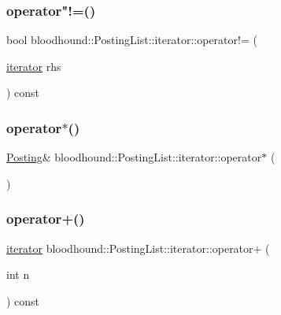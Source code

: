 \subsubsection{\texorpdfstring{operator"!=()}{operator!=()}}
{\footnotesize\ttfamily bool bloodhound\+::\+Posting\+List\+::iterator\+::operator!= (\begin{DoxyParamCaption}\item[{\hyperlink{structbloodhound_1_1PostingList_1_1iterator}{iterator}}]{rhs }\end{DoxyParamCaption}) const\hspace{0.3cm}{\ttfamily [inline]}}

\mbox{\label{structbloodhound_1_1PostingList_1_1iterator_a386a2af6b962ddd85392f1313eb16eff}} 
\subsubsection{\texorpdfstring{operator$\ast$()}{operator*()}}
{\footnotesize\ttfamily \hyperlink{structbloodhound_1_1Posting}{Posting}\& bloodhound\+::\+Posting\+List\+::iterator\+::operator$\ast$ (\begin{DoxyParamCaption}{ }\end{DoxyParamCaption})\hspace{0.3cm}{\ttfamily [inline]}}

\mbox{\label{structbloodhound_1_1PostingList_1_1iterator_a8672fb454e60ed068ae02078976543f9}} 
\subsubsection{\texorpdfstring{operator+()}{operator+()}}
{\footnotesize\ttfamily \hyperlink{structbloodhound_1_1PostingList_1_1iterator}{iterator} bloodhound\+::\+Posting\+List\+::iterator\+::operator+ (\begin{DoxyParamCaption}\item[{int}]{n }\end{DoxyParamCaption}) const\hspace{0.3cm}{\ttfamily [inline]}}

